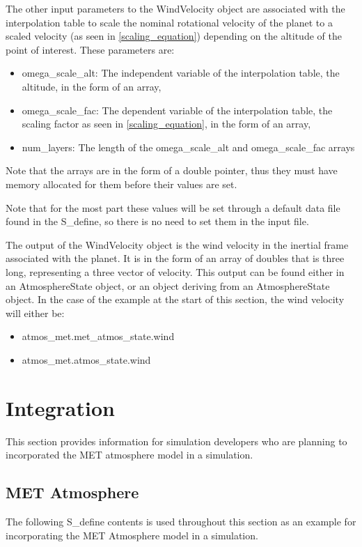 The other input parameters to the WindVelocity object are associated with the
interpolation table to scale the nominal rotational velocity of the planet
to a scaled velocity (as seen in \eqref{scaling_equation})
depending on the altitude of the point of interest. These parameters are:

\begin{itemize}
\item omega\_scale\_alt: The independent variable of the interpolation table,
the altitude, in the form of an array,
\item omega\_scale\_fac: The dependent variable of the interpolation table, the
scaling factor as seen in \eqref{scaling_equation}, in the form of an array,
\item num\_layers: The length of the omega\_scale\_alt and omega\_scale\_fac
arrays
\end{itemize}

Note that the arrays are in the form of a double pointer, thus they must have
memory allocated for them before their values are set.

Note that for the most part these values will be set through a default data file
found in the S\_define, so there is no need to set them in the input file.

The output of the WindVelocity object is the wind velocity in the inertial
frame associated with the planet. It is in the form of an array of doubles that is
three long, representing a three vector of velocity.
This output can be found either in an
AtmosphereState object, or an object deriving from an AtmosphereState object.
In the case of the example at the start of this section, the wind velocity will
either be:

\begin{itemize}
\item atmos\_met.met\_atmos\_state.wind
\item atmos\_met.atmos\_state.wind
\end{itemize}


\section{Integration}

This section provides information for simulation developers who are planning to
incorporated the MET atmosphere model in a simulation.

\subsection{MET Atmosphere}
The following S\_define contents is used throughout this section as an example
for incorporating the MET Atmosphere model in a simulation.

